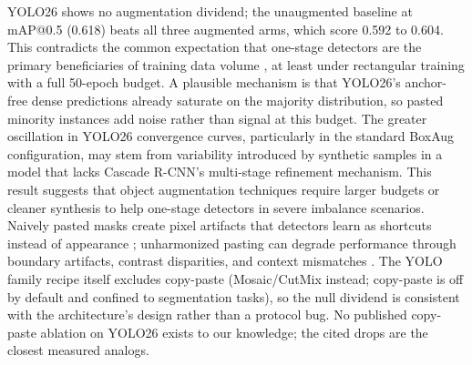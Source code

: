 \documentclass[pdflatex,sn-basic,Numbered,iicol]{sn-jnl}
\begin{document}
YOLO26 shows no augmentation dividend; the unaugmented baseline at mAP@0.5 (0.618) beats all three augmented arms, which score 0.592 to 0.604. This contradicts the common expectation that one-stage detectors are the primary beneficiaries of training data volume \citep{hussain2023yolo}, at least under rectangular training with a full 50-epoch budget. A plausible mechanism is that YOLO26's anchor-free dense predictions already saturate on the majority distribution, so pasted minority instances add noise rather than signal at this budget. The greater oscillation in YOLO26 convergence curves, particularly in the standard BoxAug configuration, may stem from variability introduced by synthetic samples in a model that lacks Cascade R-CNN's multi-stage refinement mechanism. This result suggests that object augmentation techniques require larger budgets or cleaner synthesis to help one-stage detectors in severe imbalance scenarios. Naively pasted masks create pixel artifacts that detectors learn as shortcuts instead of appearance \citep{dwibedi2017cutpaste}; unharmonized pasting can degrade performance through boundary artifacts, contrast disparities, and context mismatches \citep{dwibedi2017cutpaste,ghiasi2021simple}. The YOLO family recipe itself excludes copy-paste (Mosaic/CutMix instead; copy-paste is off by default and confined to segmentation tasks), so the null dividend is consistent with the architecture's design rather than a protocol bug. No published copy-paste ablation on YOLO26 exists to our knowledge; the cited drops are the closest measured analogs.
\end{document}

